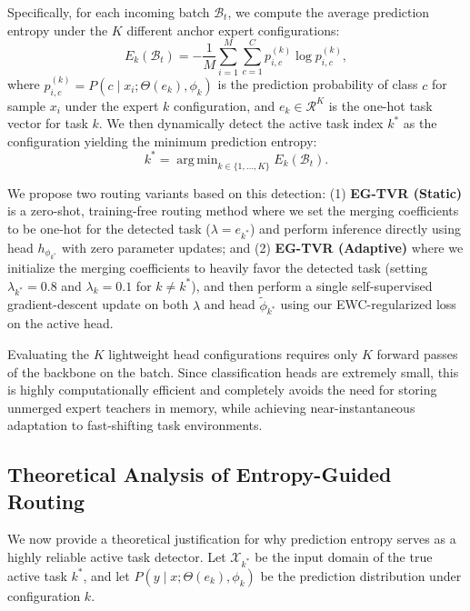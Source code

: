 \documentclass{article}
\theoremstyle{plain}
\theoremstyle{definition}
\theoremstyle{remark}
\begin{document}
Specifically, for each incoming batch $\mathcal{B}_t$, we compute the average prediction entropy under the $K$ different anchor expert configurations:
\begin{equation}
    E_k(\mathcal{B}_t) = -\frac{1}{M}\sum_{i=1}^M \sum_{c=1}^C p_{i,c}^{(k)} \log p_{i,c}^{(k)},
\end{equation}
where $p_{i,c}^{(k)} = P(c \mid x_i; \Theta(e_k), \phi_k)$ is the prediction probability of class $c$ for sample $x_i$ under the expert $k$ configuration, and $e_k \in \mathcal{R}^K$ is the one-hot task vector for task $k$. We then dynamically detect the active task index $k^*$ as the configuration yielding the minimum prediction entropy:
\begin{equation}
    k^* = \operatorname{arg\,min}_{k \in \{1, \dots, K\}} E_k(\mathcal{B}_t).
\end{equation}

We propose two routing variants based on this detection: (1) \textbf{EG-TVR (Static)} is a zero-shot, training-free routing method where we set the merging coefficients to be one-hot for the detected task ($\lambda = e_{k^*}$) and perform inference directly using head $h_{\phi_{k^*}}$ with zero parameter updates; and (2) \textbf{EG-TVR (Adaptive)} where we initialize the merging coefficients to heavily favor the detected task (setting $\lambda_{k^*} = 0.8$ and $\lambda_k = 0.1$ for $k \neq k^*$), and then perform a single self-supervised gradient-descent update on both $\lambda$ and head $\tilde{\phi}_{k^*}$ using our EWC-regularized loss on the active head.

Evaluating the $K$ lightweight head configurations requires only $K$ forward passes of the backbone on the batch. Since classification heads are extremely small, this is highly computationally efficient and completely avoids the need for storing unmerged expert teachers in memory, while achieving near-instantaneous adaptation to fast-shifting task environments.

\subsection{Theoretical Analysis of Entropy-Guided Routing}
We now provide a theoretical justification for why prediction entropy serves as a highly reliable active task detector. Let $\mathcal{X}_{k^*}$ be the input domain of the true active task $k^*$, and let $P(y \mid x; \Theta(e_k), \phi_k)$ be the prediction distribution under configuration $k$.
\end{document}
